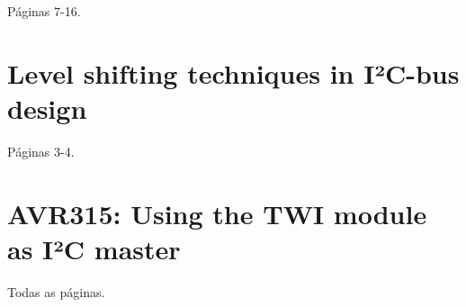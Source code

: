 \documentclass[brazil,pagestart=firstchapter]{abnt}
\begin{document}
Páginas 7-16. \cite{AN97055}




\chapter{Level shifting techniques in I²C-bus design}
\label{anx:AN10441_pdf}

Páginas 3-4. \cite{AN10441}




\chapter{AVR315: Using the TWI module as I²C master}
\label{anx:avr315_pdf}

Todas as páginas. \cite{AVR315}


\end{document}
